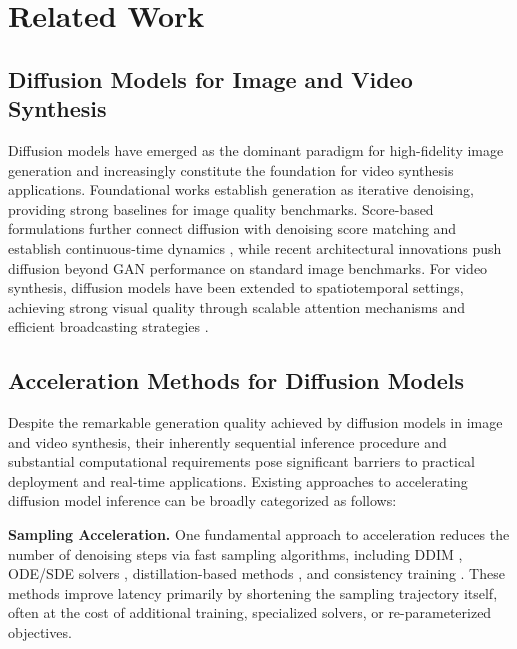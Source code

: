\section{Related Work}\label{sec:related}

\subsection{%
	Diffusion Models for Image and Video Synthesis}\label{sub:related:diffusion_models}

Diffusion models
have emerged
as the dominant paradigm
for high-fidelity image generation
and increasingly constitute the foundation for video synthesis applications.
Foundational works establish generation
as iterative denoising\cite{%
	pmlr-v37-sohl-dickstein15, ho2020denoising},
providing strong baselines
for image quality benchmarks.
Score-based formulations
further connect diffusion
with denoising score matching
and establish continuous-time dynamics
\cite{%
	song2019generative},
while recent architectural innovations
push diffusion beyond GAN performance
on standard image benchmarks\cite{dhariwal2021diffusionmodelsbeatgans}.
For video synthesis,
diffusion models have been extended
to spatiotemporal settings,
achieving strong visual quality
through scalable attention mechanisms
and efficient broadcasting strategies
\cite{zhao2025realtimevideogenerationpyramid}.

\subsection{%
	Acceleration Methods for Diffusion Models}\label{sub:related:acceleration_methods}

Despite the remarkable generation quality
achieved by diffusion models
in image and video synthesis,
their inherently sequential inference procedure
and substantial computational requirements
pose significant barriers
to practical deployment
and real-time applications.
Existing approaches
to accelerating diffusion model inference
can be broadly categorized as follows:

\textbf{Sampling Acceleration.}
One fundamental approach to acceleration
reduces the number of denoising steps
via fast sampling algorithms,
including DDIM \cite{song2020denoising},
ODE/SDE solvers \cite{Karras2022edm,Lu_2025},
distillation-based methods \cite{salimans2022progressivedistillationfastsampling},
and consistency training \cite{song2023consistencymodels,luo2023latent}.
These methods improve latency primarily by shortening
the sampling trajectory itself,
often at the cost of additional training,
specialized solvers,
or re-parameterized objectives.


